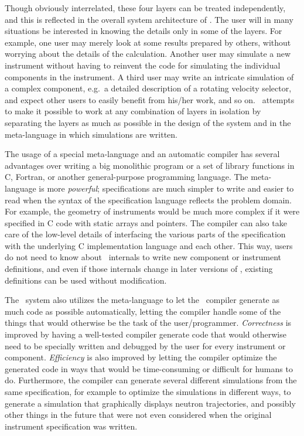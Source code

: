 Though obviously interrelated, these four layers can be
treated independently, and this is reflected in the overall system
architecture of \MCS. The user will in many situations be
interested in knowing the details only in some of the layers. For
example, one user may merely look at some results prepared by others,
without worrying about the details of the calculation. Another user
may simulate a new instrument without having to reinvent the
code for simulating the individual components in the instrument. A third
user may write an intricate simulation of a complex component,
e.g.\ a detailed description of a rotating velocity selector, 
and expect other users to easily
benefit from his/her work, and so on. \MCS\ attempts to make it
possible to work at any combination of layers in isolation by separating
the layers as much as possible in the design of the system and in
the meta-language in which simulations are written.

The usage of a special meta-language and an automatic compiler has
several advantages over writing a big monolithic program or a set of
library functions in C, Fortran, or another general-purpose programming
language.  The meta-language is more \textit{powerful}; specifications
are much simpler to write and easier to read when the syntax of the
specification language reflects the problem domain. For example, the
geometry of instruments would be much more complex if it were specified
in C code with static arrays and pointers. The compiler can also take
care of the low-level details of interfacing the various parts of the
specification with the underlying C implementation language and each
other. This way, users do not need to know about \MCS\ internals to
write new component or instrument definitions, and even if those
internals change in later versions of \MCS, existing definitions can be
used without modification.

The \MCS\ system also utilizes the meta-language to let the \MCS\ 
compiler generate as much code as possible automatically, letting the
compiler handle some of the things that would otherwise be the task of
the user/programmer. \textit{Correctness} is improved by having a well-tested
compiler generate code that would otherwise need to be specially written
and debugged by the user for every instrument or component. \textit{Efficiency}
is also improved by letting the compiler optimize the generated code in
ways that would be time-consuming or difficult for humans to do. Furthermore, the
compiler can generate several different simulations from the same
specification, for example to optimize the simulations in different
ways, to generate a simulation that graphically displays neutron
trajectories, and possibly other things in the future that were not even
considered when the original instrument specification was written.


